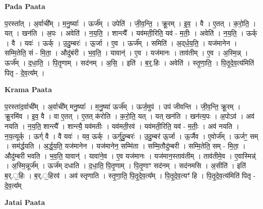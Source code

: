 \documentclass[17pt]{extarticle}
\begin{document}
\textbf{Pada Paata} \newline

प॒रस्ता᳚त् । अ॒र्वाची᳚म् । म॒नु॒ष्याः᳚ । ऊर्ज᳚म् । उपेति॑ । जी॒व॒न्ति॒ । क्रू॒रम् । इ॒व॒ । वै । ए॒तत् । क॒रो॒ति॒ । यत् । खन॑ति । अ॒पः । अवेति॑ । न॒य॒ति॒ । शान्त्यै᳚ । यव॑मती॒रिति॒ यव॑ - म॒तीः॒ । अवेति॑ । न॒य॒ति॒ । ऊर्क् । वै । यवः॑ । ऊर्क् । उ॒दु॒म्बरः॑ । ऊ॒र्जा । ए॒व । ऊर्ज᳚म् । समिति॑ । अ॒द्‌र्ध॒य॒ति॒ । यज॑मानेन । सम्मि॒तेति॒ सं - मि॒ता॒ । औदु॑बंरी । भ॒व॒ति॒ । यावान्॑ । ए॒व । यज॑मानः । ताव॑तीम् । ए॒व । अ॒स्मि॒न्न् । ऊर्ज᳚म् । द॒धा॒ति॒ । पि॒तृ॒णाम् । सद॑नम् । अ॒सि॒ । इति॑ । ब॒र्॒.हिः । अवेति॑ । स्तृ॒णा॒ति॒ । पि॒तृ॒दे॒व॒त्य॑मिति॑ पितृ - दे॒व॒त्य᳚म् ।  \newline


\textbf{Krama Paata} \newline

प॒रस्ता॑द॒र्वाची᳚म् । अ॒र्वाची᳚म् मनु॒ष्याः᳚ । म॒नु॒ष्या॑ ऊर्ज᳚म् । ऊर्ज॒मुप॑ । उप॑ जीवन्ति । जी॒व॒न्ति॒ क्रू॒रम् । क्रू॒रमि॑व । इ॒व॒ वै । वा ए॒तत् । ए॒तत् क॑रोति । क॒रो॒ति॒ यत् । यत् खन॑ति । खन॑त्य॒पः । अ॒पोऽव॑ । अव॑ नयति । न॒य॒ति॒ शान्त्यै᳚ । शान्त्यै॒ यव॑मतीः । यव॑मती॒रव॑ । यव॑मती॒रिति॒ यव॑ - म॒तीः॒ । अव॑ नयति । न॒य॒त्यूर्क् । ऊर्ग् वै । वै यवः॑ । यव॒ ऊर्क् । ऊर्गु॑दु॒म्बरः॑ । उ॒दु॒म्बर॑ ऊ॒र्जा । ऊ॒र्जैव । ए॒वोर्ज᳚म् । ऊर्जꣳ॒॒ सम् । सम॑र्द्धयति । अ॒र्द्ध॒य॒ति॒ यज॑मानेन । यज॑मानेन॒ सम्मि॑ता । सम्मि॒तौदु॑म्बरी । सम्मि॒तेति॒ सम् - मि॒ता॒ । औदु॑म्बरी भवति । भ॒व॒ति॒ यावान्॑ । यावा॑ने॒व । ए॒व यज॑मानः । यज॑मान॒स्ताव॑तीम् । ताव॑तीमे॒व । ए॒वास्मिन्न्॑ । अ॒स्मि॒न्नूर्ज᳚म् । ऊर्ज॑म् दधाति । द॒धा॒ति॒ पि॒तृ॒णाम् । पि॒तृ॒णाꣳ सद॑नम् । सद॑नमसि । अ॒सीति॑ । इति॑ ब॒र्.॒हिः । ब॒र्.॒हिरव॑ । अव॑ स्तृणाति । स्तृ॒णा॒ति॒ पि॒तृ॒दे॒व॒त्य᳚म् । पि॒तृ॒दे॒व॒त्यꣳ॑ हि । पि॒तृ॒दे॒व॒त्य॑मिति॑ पितृ - दे॒व॒त्य᳚म् \newline

\textbf{Jatai Paata} \newline
\end{document}
